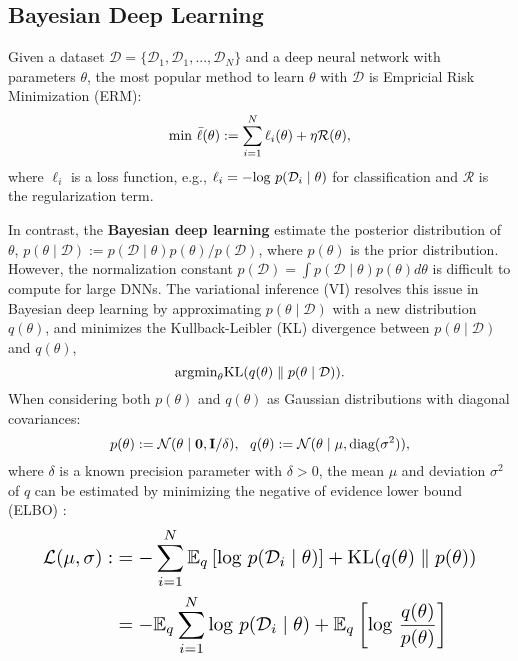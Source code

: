 \documentclass[10pt,twocolumn,letterpaper]{article}
\begin{document}
\subsection{Bayesian Deep Learning}
\label{sec2.2}


Given a dataset $\mathcal{D}=\{\mathcal{D}_1, \mathcal{D}_1,...,\mathcal{D}_N\}$ and a deep neural network with parameters $\theta$, the most popular method to learn $\theta$ with $\mathcal{D}$ is Empricial Risk Minimization (ERM):
\begin{equation} \label{eq:erm}
\textup{min}\ \bar{\ell}(\theta):=\sum_{i=1}^{N}\ell_i(\theta)+\eta \mathcal{R}(\theta),
\end{equation}
where $\ell_i$ is a loss function, e.g., $\ell_i=-\textup{log}\ p(\mathcal{D}_i \mid \theta)$ for classification and $\mathcal{R}$ is the regularization term.

In contrast, the \textbf{Bayesian deep learning} estimate the posterior distribution of $\theta$, $p(\theta \mid \mathcal{D}):= p(\mathcal{D}\mid \theta )p(\theta )/p(\mathcal{D})$, where $p(\theta)$ is the prior distribution. However, the normalization constant $p(\mathcal{D})=\int p(\mathcal{D}\mid \theta )p(\theta )d\theta$ is difficult to compute for large DNNs. The variational inference (VI)  \cite{graves2011practical} resolves this issue in Bayesian deep learning by approximating $p(\theta \mid \mathcal{D})$ with a new distribution $q(\theta)$, and minimizes the Kullback-Leibler (KL) divergence between $p(\theta \mid \mathcal{D})$ and $q(\theta)$,
\begin{equation} \label{eq:minKL}
\textup{argmin}_\theta \textup{KL}(q(\theta)\parallel p(\theta \mid \mathcal{D})).
\end{equation}
When considering both $p(\theta)$ and $q(\theta)$ as Gaussian distributions with diagonal covariances:
\begin{equation} \label{eq:GaussianDistri}
p(\theta):=\mathcal{N}(\theta \mid \mathbf{0},\mathbf{I}/ \delta), \ \ q(\theta):=\mathcal{N}(\theta \mid \mu, \textup{diag}(\sigma ^2)),
\end{equation}
where $\delta$ is a known precision parameter with $\delta>0$, the mean $\mu$ and deviation $\sigma ^2$ of $q$ can be estimated by minimizing the negative of evidence lower bound (ELBO) \cite{blei2017variational}:
\begin{equation} \label{eq:ELBO}
\resizebox{.9\linewidth}{!}{$
    \displaystyle
\begin{aligned}
\mathcal{L}(\mu ,\sigma):&=-\sum_{i=1}^{N}\mathbb{E}_q \left [ \textup{log}\ p(\mathcal{D}_i \mid \theta) \right ]+ \textup{KL}(q(\theta)\parallel p(\theta))\\
&=-\mathbb{E}_q \sum_{i=1}^{N}  \textup{log}\ p(\mathcal{D}_i \mid \theta)+ \mathbb{E}_q \left [ \textup{log}\ \frac{q(\theta)}{p(\theta)} \right ] \\
\end{aligned}
$}
\end{equation}
\end{document}

